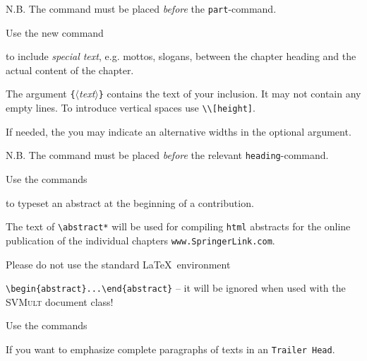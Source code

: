 \documentclass[graybox]{svmult}
\begin{document}
\begin{refguide}
\begin{sloppy}
N.B. The command must be placed \textit{before} the \verb|part|-command.

Use the new command

\cprotect{}

to include \textit{special text}, e.g. mottos, slogans, between the chapter heading and
the actual content of the chapter.

The argument \verb|{|$\langle$\textit{text}$\rangle$\verb|}| contains the text of your inclusion. It may not contain
any empty lines. To introduce vertical spaces use \verb|\\[height]|.

If needed, the you may indicate an alternative widths in the optional argument.

N.B. The command must be placed \textit{before} the relevant \verb|heading|-command.

Use the commands

\cprotect{}

to typeset an abstract at the beginning of a contribution.

The text of \verb|\abstract*| will be used for compiling \verb|html| abstracts for the online publication of the
individual chapters \verb|www.SpringerLink.com|.

Please do not use the standard \LaTeX\ environment 

\verb|\begin{abstract}...\end{abstract}| -- it will be ignored when used with the
\textsc{SVMult} document class!

Use the commands

\cprotect{}

If you want to emphasize complete paragraphs of texts in an \verb|Trailer Head|.  


\end{sloppy}
\end{refguide}
\end{document}
